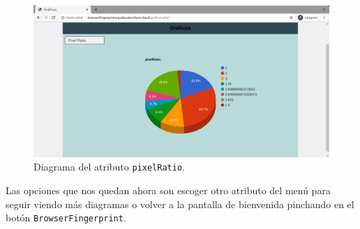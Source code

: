 \begin{figure}[tbp]
	\centering
	\includegraphics[width=1\textwidth]{Images/pixelRatioChart.png}
	\caption{Diagrama del atributo \texttt{pixelRatio}.}
	\label{fig:pixelRatioChart}
\end{figure}

Las opciones que nos quedan ahora son escoger otro atributo del menú para seguir viendo más diagramas o volver a la pantalla de bienvenida pinchando en el botón \texttt{BrowserFingerprint}.
